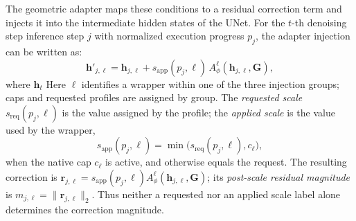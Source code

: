 \documentclass[times,twocolumn,final]{elsarticle}
\providecommand{\DIFadd}[1]{{\protect\color{blue} \sf #1}} %
\providecommand{\DIFdel}[1]{{\protect\color{red} \scriptsize #1}} %
\providecommand{\DIFaddbegin}{} %
\providecommand{\DIFaddend}{} %
\providecommand{\DIFdelbegin}{} %
\providecommand{\DIFdelend}{} %
\begin{document}
The geometric adapter maps these conditions to a residual correction term and injects it into the intermediate hidden states of the UNet. For \DIFdelbegin \DIFdel{the $t$-th denoising step }\DIFdelend \DIFaddbegin \DIFadd{inference step $j$ with normalized execution progress $p_j$}\DIFaddend , the adapter injection can be written as:
\DIFdelbegin %
\DIFdelend \DIFaddbegin \begin{equation}
\mathbf{h}'_{j,\ell} = \mathbf{h}_{j,\ell} + s_{\mathrm{app}}(p_j,\ell)\, A^\ell_\phi(\mathbf{h}_{j,\ell}, \mathbf{G}),
\label{eq:injection}
\end{equation}\DIFaddend
\DIFdelbegin \DIFdel{where $\mathbf{h}_t$ }\DIFdelend \DIFaddbegin \DIFadd{Here $\ell$ identifies a wrapper within one of the three injection groups; caps and requested profiles are assigned by group. The \emph{requested scale} $s_{\mathrm{req}}(p_j,\ell)$ is the value assigned by the profile; the \emph{applied scale} is the value used by the wrapper,
}\begin{equation}
s_{\mathrm{app}}(p_j,\ell)=\min\!\bigl(s_{\mathrm{req}}(p_j,\ell),c_\ell\bigr),
\end{equation}
\DIFadd{when the native cap $c_\ell$ is active, and otherwise equals the request. The resulting correction is $\mathbf{r}_{j,\ell}=s_{\mathrm{app}}(p_j,\ell)A^\ell_\phi(\mathbf{h}_{j,\ell},\mathbf{G})$; its \emph{post-scale residual magnitude} is $m_{j,\ell}=\|\mathbf{r}_{j,\ell}\|_2$. Thus neither a requested nor an applied scale label alone determines the correction magnitude.
}
\end{document}
